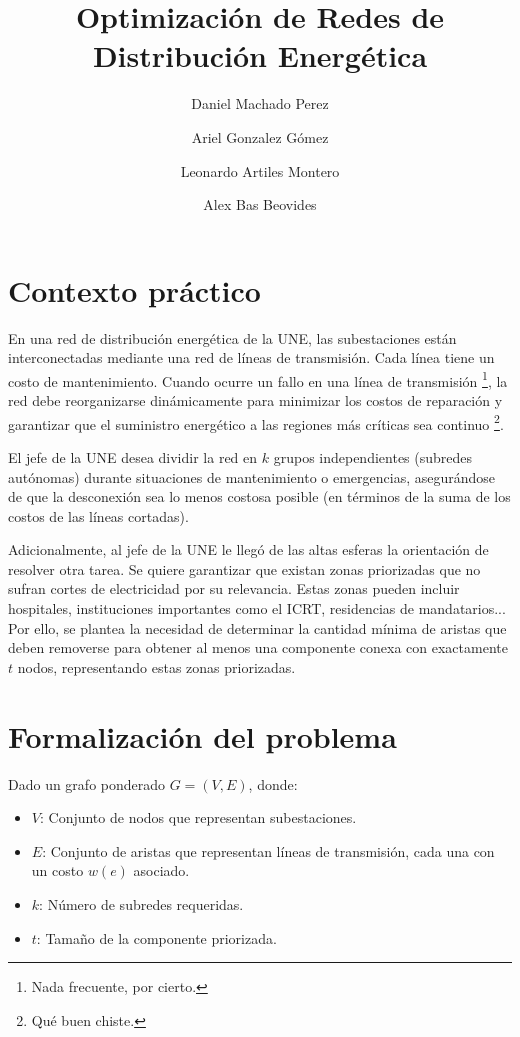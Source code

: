 \documentclass[a4paper, 12pt]{article}
\title{\textbf{Optimización de Redes de Distribución Energética}}
\author{Daniel Machado Perez \and
Ariel Gonzalez Gómez \and
Leonardo Artiles Montero \and
Alex Bas Beovides}
\date{}
\begin{document}
\maketitle

\section{Contexto práctico}
En una red de distribución energética de la UNE, 
las subestaciones están interconectadas mediante 
una red de líneas de transmisión. Cada línea tiene 
un costo de mantenimiento. 
Cuando ocurre un fallo en una línea de transmisión 
\footnote{Nada frecuente, por cierto.}, 
la red debe reorganizarse dinámicamente 
para minimizar los costos de reparación y garantizar 
que el suministro energético a las regiones más 
críticas sea continuo \footnote{Qué buen chiste.}.

El jefe de la UNE desea dividir la red en \( k \) 
grupos independientes (subredes autónomas) durante 
situaciones de mantenimiento o emergencias, 
asegurándose de que la desconexión sea lo menos 
costosa posible (en términos de la suma de los 
costos de las líneas cortadas).

Adicionalmente, al jefe de la UNE le llegó de las altas esferas
la orientación de resolver otra tarea. 
Se quiere garantizar que existan zonas priorizadas que 
no sufran cortes de electricidad por su relevancia. 
Estas zonas pueden incluir hospitales, instituciones importantes como el ICRT, 
residencias de mandatarios... 
Por ello, se plantea la necesidad de determinar la 
cantidad mínima de aristas que deben removerse para 
obtener al menos una componente conexa con 
exactamente \( t \) nodos, representando estas zonas 
priorizadas.

\section{Formalización del problema}
Dado un grafo ponderado \( G = (V, E) \), donde:
\begin{itemize}
    \item \( V \): Conjunto de nodos que representan subestaciones.
    \item \( E \): Conjunto de aristas que representan líneas de transmisión, cada una con un costo \( w(e) \) asociado.
    \item \( k \): Número de subredes requeridas.
    \item \( t \): Tamaño de la componente priorizada.
\end{itemize}
\end{document}
